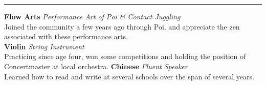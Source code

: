 \documentclass[14, .75in]{article}
\begin{document}
  \vspace{0.1cm} \hrule \vspace{0.3cm}
  \noindent\textbf{Flow Arts}\textit{ Performance Art of Poi \& Contact Juggling}\\
  Joined the community a few years ago through Poi, and appreciate the zen associated with these performance arts.\\
  \textbf{Violin}\textit{ String Instrument}\\
  Practicing since age four, won some competitions and holding the position of Concertmaster at local orchestra.
  \textbf{Chinese}\textit{ Fluent Speaker}\\
  Learned how to read and write at several schools over the span of several years.
\end{document}
